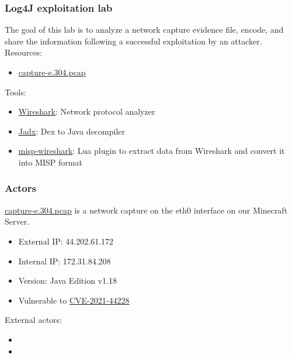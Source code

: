 
\begin{frame}[t,plain]
\titlepage
\end{frame}

\begin{frame}
    \frametitle{Log4J exploitation lab}
    The goal of this lab is to analyze a network capture evidence file, encode, and share the information following a successful exploitation by an attacker.
	\linebreak
	\linebreak
	\linebreak
    Resources:
    \begin{itemize}
        \item \href{https://github.com/MISP/misp-training-lea/tree/main/e.304-lab3-encoding-information-and-sharing-it-2/for-students/capture-e.304.pcap}{\underline{capture-e.304.pcap}}
    \end{itemize}
    Tools:
    \begin{itemize}
        \item \href{https://www.wireshark.org/}{\underline{Wireshark}}: Network protocol analyzer
        \item \href{https://github.com/skylot/jadx}{\underline{Jadx}}: Dex to Java decompiler
        \item \href{https://github.com/MISP/misp-wireshark}{\underline{misp-wireshark}}: Lua plugin to extract data from Wireshark and convert it into MISP format 
    \end{itemize}

    \note[item]{}
\end{frame}

\begin{frame}
    \frametitle{Actors}
    \href{https://github.com/MISP/misp-training-lea/tree/main/e.304-lab3-encoding-information-and-sharing-it-2/for-students/capture-e.304.pcap}{\underline{capture-e.304.pcap}} is a network capture on the eth0 interface on our Minecraft Server.
    \linebreak
    \linebreak
    {\color{blue}{\bf Minecraft Server}}
    \begin{itemize}
    	\item External IP: 44.202.61.172
	    \item Internal IP: 172.31.84.208
	    \item Version: Java Edition v1.18 
	    \item Vulnerable to \href{https://nvd.nist.gov/vuln/detail/CVE-2021-44228}{CVE-2021-44228}
    \end{itemize}
    
    External actors:
    \begin{itemize}
        \item {\color{green}{\bf Player}}
        \item {\color{red}{\bf Attacker}}
    \end{itemize}

    \note[item]{}
\end{frame}

